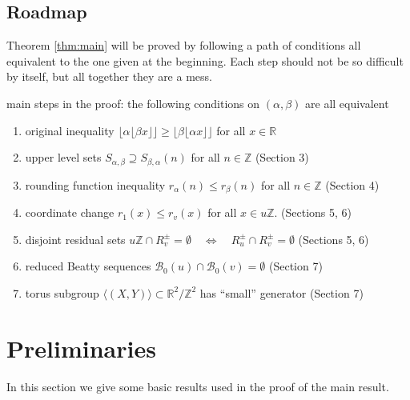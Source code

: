 \documentclass[12pt,letterpaper, reqno]{amsart}
\theoremstyle{definition}
\theoremstyle{remark}
\newcommand{\RR}{\ensuremath{\mathbb{R}}}
\newcommand{\ZZ}{\ensuremath{\mathbb{Z}}}
\newcommand{\sB}{{\mathcal B}}
\newcommand{\floor}[1]{\lfloor{#1}\rfloor}
\begin{document}
%
\subsection{Roadmap}

Theorem \ref{thm:main} will be proved by following a path of conditions all equivalent to the one given at the beginning. Each step should not be so difficult by itself, but all together they are a mess.

main steps in the proof: the following conditions on $(\alpha,\beta)$ are all equivalent
\begin{enumerate}
\item original inequality $\floor{\alpha\floor{\beta x}} \geq \floor{\beta\floor{\alpha x}}$ {for all } $x\in \RR$ 
\item upper level sets $S_{\alpha,\beta}\supseteq S_{\beta,\alpha}(n)$ for all $n \in \ZZ$
(Section 3)
\item rounding function inequality $r_\alpha(n)\leq r_\beta(n)$ for all $n\in \ZZ$
(Section 4)
\item coordinate change $r_1(x)\leq r_v(x)$ for all $x\in u\ZZ$.
(Sections 5, 6)
\item disjoint residual sets $u\ZZ\cap R^\pm_v = \emptyset \quad\Leftrightarrow\quad R^\pm_u\cap R^\pm_v = \emptyset$ 
(Sections 5, 6)
\item reduced Beatty sequences $\sB_0(u)\cap\sB_0(v) = \emptyset$
(Section 7)
\item torus subgroup $\langle(X,Y)\rangle\subset\RR^2/\ZZ^2$ has ``small'' generator
(Section 7)

\end{enumerate}


%
%
\section{Preliminaries}\label{sec:2} 
\setcounter{equation}{0}

In this section we give some basic results used in the proof of the main result. 
%
%
\end{document}
